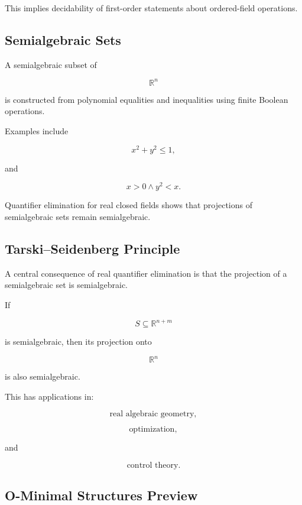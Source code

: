 This implies decidability of first-order statements about ordered-field
operations.

\subsection{Semialgebraic Sets}
\label{subsec:semialgebraic-model-theory}

A semialgebraic subset of

\[
\mathbb{R}^n
\]

is constructed from polynomial equalities and inequalities using finite
Boolean operations.

Examples include

\[
\boxed{
x^2+y^2\leq1,
}
\]

and

\[
\boxed{
x>0
\land
y^2<x.
}
\]

Quantifier elimination for real closed fields shows that projections of
semialgebraic sets remain semialgebraic.

\subsection{Tarski--Seidenberg Principle}
\label{subsec:tarski-seidenberg}

A central consequence of real quantifier elimination is that the projection
of a semialgebraic set is semialgebraic.

If

\[
S
\subseteq
\mathbb{R}^{n+m}
\]

is semialgebraic, then its projection onto

\[
\mathbb{R}^n
\]

is also semialgebraic.

This has applications in:

\[
\boxed{
\text{real algebraic geometry},
}
\]

\[
\boxed{
\text{optimization},
}
\]

and

\[
\boxed{
\text{control theory}.
}
\]

\subsection{O-Minimal Structures Preview}
\label{subsec:o-minimality-preview}

